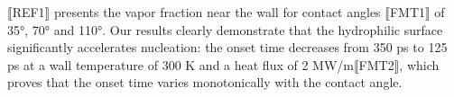 ⟦REF1⟧ presents the vapor fraction near the wall for contact angles ⟦FMT1⟧ of 35°, 70° and 110°. Our results clearly demonstrate that the hydrophilic surface significantly accelerates nucleation: the onset time decreases from 350 ps to 125 ps at a wall temperature of 300 K and a heat flux of 2 MW/m⟦FMT2⟧, which proves that the onset time varies monotonically with the contact angle.